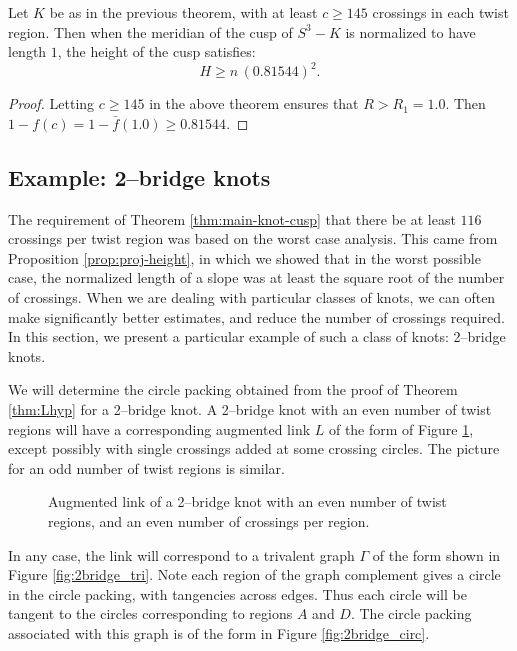 \begin{corollary}
  Let $K$ be as in the previous theorem, with at least $c\geq 145$
  crossings in each twist region.  Then when the meridian of the cusp
  of $S^3-K$ is normalized to have length $1$, the height of the cusp
  satisfies: $$H \geq n\,(0.81544)^2.$$
\label{cor:0.8}
\end{corollary}

\begin{proof}
  Letting $c\geq 145$ in the above theorem ensures that $R> R_1 =
  1.0$.  Then $1-f(c) = 1-\bar{f}(1.0) \geq 0.81544$.
\end{proof}



\subsection{Example: 2--bridge knots}
\label{subsec:2bridge}

The requirement of Theorem \ref{thm:main-knot-cusp} that there be at
least $116$ crossings per twist region was based on the worst case
analysis.  This came from Proposition \ref{prop:proj-height}, in which
we showed that in the worst possible case, the normalized length of a
slope was at least the square root of the number of crossings.  When
we are dealing with particular classes of knots, we can often make
significantly better estimates, and reduce the number of crossings
required.  In this section, we present a particular example of such a
class of knots:  2--bridge knots.

We will determine the circle packing obtained from the proof of
Theorem \ref{thm:Lhyp} for a 2--bridge knot.  A 2--bridge knot with an
even number of twist regions will have a corresponding augmented link
$L$ of the form of Figure \ref{fig:2bridge}, except possibly with
single crossings added at some crossing circles.  The picture for an
odd number of twist regions is similar.

\begin{figure}
  \begin{center}
  
  \end{center}
  \caption{Augmented link of a 2--bridge knot with an even number
    of twist regions, and an even number of crossings per region.}
  \label{fig:2bridge}
\end{figure}

In any case, the link will correspond to a trivalent graph $\Gamma$ of
the form shown in Figure \ref{fig:2bridge_tri}.  Note each region of
the graph complement gives a circle in the circle packing, with
tangencies across edges. Thus each circle will be tangent to the
circles corresponding to regions $A$ and $D$.  The circle packing
associated with this graph is of the form in Figure
\ref{fig:2bridge_circ}.

